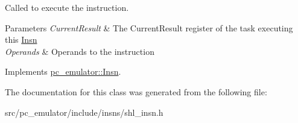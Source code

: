 Called to execute the instruction. 


\begin{DoxyParams}{Parameters}
{\em Current\+Result} & The Current\+Result register of the task executing this \hyperlink{classpc__emulator_1_1Insn}{Insn} \\
\hline
{\em Operands} & Operands to the instruction \\
\hline
\end{DoxyParams}


Implements \hyperlink{classpc__emulator_1_1Insn_a103d27030e872a799e313df16c1f3d66}{pc\+\_\+emulator\+::\+Insn}.



The documentation for this class was generated from the following file\+:\begin{DoxyCompactItemize}
\item 
src/pc\+\_\+emulator/include/insns/shl\+\_\+insn.\+h\end{DoxyCompactItemize}
